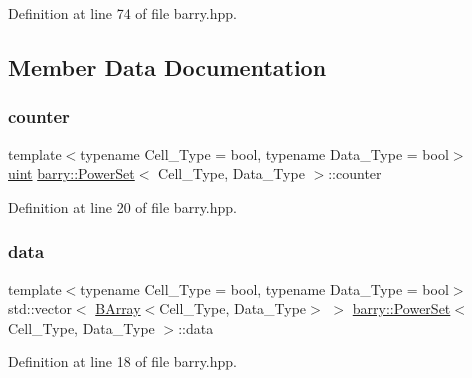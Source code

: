 Definition at line 74 of file barry.\+hpp.



\subsection{Member Data Documentation}
\mbox{\label{classbarry_1_1_power_set_a5d318c7894867263313e2907c8821c70}} 
\subsubsection{\texorpdfstring{counter}{counter}}
{\footnotesize\ttfamily template$<$typename Cell\+\_\+\+Type  = bool, typename Data\+\_\+\+Type  = bool$>$ \\
\hyperlink{namespacebarry_a11dfc53ddb4672278319aa04f1e09a6c}{uint} \hyperlink{classbarry_1_1_power_set}{barry\+::\+Power\+Set}$<$ Cell\+\_\+\+Type, Data\+\_\+\+Type $>$\+::counter}



Definition at line 20 of file barry.\+hpp.

\mbox{\label{classbarry_1_1_power_set_a0484531e1f473af904d8045d375dabd7}} 
\subsubsection{\texorpdfstring{data}{data}}
{\footnotesize\ttfamily template$<$typename Cell\+\_\+\+Type  = bool, typename Data\+\_\+\+Type  = bool$>$ \\
std\+::vector$<$ \hyperlink{classbarry_1_1_b_array}{B\+Array}$<$Cell\+\_\+\+Type, Data\+\_\+\+Type$>$ $>$ \hyperlink{classbarry_1_1_power_set}{barry\+::\+Power\+Set}$<$ Cell\+\_\+\+Type, Data\+\_\+\+Type $>$\+::data}



Definition at line 18 of file barry.\+hpp.

\mbox{\label{classbarry_1_1_power_set_a33f837a6cdcbaec8d06a3ce3311ea4ca}} 
